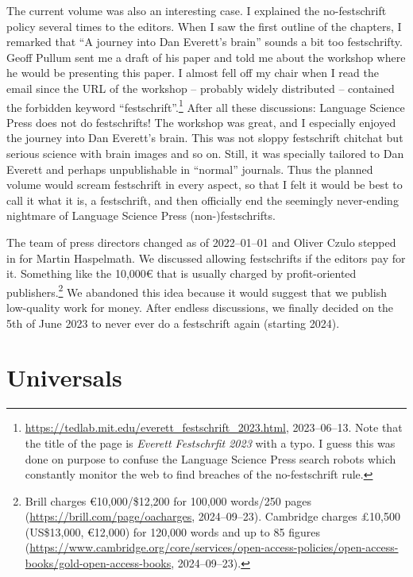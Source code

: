 \documentclass[output=paper,colorlinks,citecolor=brown]{langscibook}
\begin{document}
The current volume was also an interesting case. I explained the no-festschrift policy several
times to the editors. When I saw the first outline of the chapters, I remarked that ``A journey into Dan Everett's
brain'' sounds a bit too festschrifty. Geoff Pullum sent me a draft of his paper and told me
about the workshop where he would be presenting this paper. I almost fell off my chair when I
read the email since the URL of the workshop -- probably widely distributed -- contained the forbidden keyword
``festschrift''.\footnote{
\url{https://tedlab.mit.edu/everett_festschrift_2023.html}, 2023--06--13. Note that the title of the
page is \emph{Everett Festschrfit 2023} with a typo. I guess this was done on purpose to confuse the
Language Science Press search robots which constantly monitor the web to find breaches of the
no-festschrift rule.
} After all these discussions: Language Science Press does not do festschrifts! The
workshop was great, and I especially enjoyed the journey into Dan Everett's brain. This was not
sloppy festschrift chitchat but serious science with brain images and so on. Still, it was specially
tailored to Dan Everett and perhaps unpublishable in ``normal'' journals. Thus the planned volume would
scream festschrift in every aspect, so that I felt it would be best to call it what it is, a festschrift,
and then officially end the seemingly never-ending nightmare of Language Science Press (non-)festschrifts. 

The team of press directors changed as of 2022--01--01 and Oliver Czulo stepped in for
Martin Haspelmath. We discussed allowing festschrifts if the editors pay for it. Something like the
10,000€ that is usually charged by profit-oriented publishers.\footnote{
Brill charges €10,000/\$12,200 for 100,000 words/250 pages (\url{https://brill.com/page/oacharges},
2024--09--23). Cambridge charges £10,500 (US\$13,000, €12,000) for 120,000 words and up to 85 figures
(\url{https://www.cambridge.org/core/services/open-access-policies/open-access-books/gold-open-access-books}, 2024--09--23).
} 
 We abandoned this idea because it would suggest that we publish low-quality work for money. After endless discussions, we
finally decided on the 5th of June 2023 to never ever do a festschrift again (starting 2024). 






\section{Universals}
\end{document}
